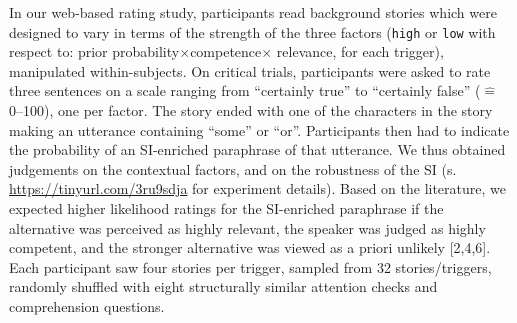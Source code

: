 \documentclass[11pt,letterpaper]{article}
\begin{document}
In our web-based rating study, participants read background stories which were designed to vary in terms of the strength of the three factors (\texttt{high} or \texttt{low} with respect to: prior probability$\times$competence$\times$ relevance, for each trigger), manipulated within-subjects.
On critical trials, participants were asked to rate three sentences on a scale ranging from ``certainly true'' to ``certainly false'' ($\widehat{=}$0--100), one per factor. 
The story ended with one of the characters in the story making an utterance containing ``some'' or ``or''. Participants then had to indicate the probability of an SI-enriched paraphrase of that utterance. 
We thus obtained judgements on the contextual factors, and on the robustness of the SI (s. \url{https://tinyurl.com/3ru9sdja} for experiment details). 
Based on the literature, we expected higher likelihood ratings for the SI-enriched paraphrase if the alternative was perceived as highly relevant, the speaker was judged as highly competent, and the stronger alternative was viewed as a priori unlikely [2,4,6]. Each participant saw four stories per trigger, sampled from 32 stories/triggers, randomly shuffled with eight structurally similar attention checks and comprehension questions.
\end{document}
